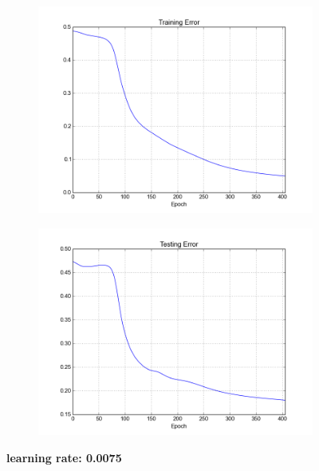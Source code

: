 \begin{figure}[h]	
	\begin{subfigure}[b]{0.5\textwidth}
		\includegraphics[width=\linewidth]{fig/trainingerror_lr0,0075_eps0,05_regparam0,00_beta5_batch1.png}
	\end{subfigure}
	\begin{subfigure}[b]{0.5\textwidth}
		\includegraphics[width=\linewidth]{fig/valerror_lr0,0075_eps0,05_regparam0,00_beta5_batch1.png}
	\end{subfigure}

	\caption{\textbf{learning rate: 0.0075}}
\end{figure}



